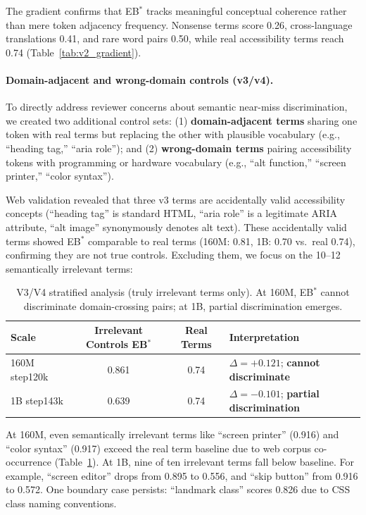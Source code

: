 \documentclass[10pt]{article} %
\begin{document}
The gradient confirms that EB$^*$ tracks meaningful conceptual coherence rather than mere token adjacency frequency. Nonsense terms score 0.26, cross-language translations 0.41, and rare word pairs 0.50, while real accessibility terms reach 0.74 (Table~\ref{tab:v2_gradient}).

\paragraph{Domain-adjacent and wrong-domain controls (v3/v4).}
To directly address reviewer concerns about semantic near-miss discrimination, we created two additional control sets:
(1) \textbf{domain-adjacent terms} sharing one token with real terms but replacing the other with plausible vocabulary (e.g., ``heading tag,'' ``aria role''); and
(2) \textbf{wrong-domain terms} pairing accessibility tokens with programming or hardware vocabulary (e.g., ``alt function,'' ``screen printer,'' ``color syntax'').

Web validation revealed that three v3 terms are accidentally valid accessibility concepts (``heading tag'' is standard HTML, ``aria role'' is a legitimate ARIA attribute, ``alt image'' synonymously denotes alt text).
These accidentally valid terms showed EB$^*$ comparable to real terms (160M: 0.81, 1B: 0.70 vs.\ real 0.74), confirming they are not true controls.
Excluding them, we focus on the 10--12 semantically irrelevant terms:

\begin{table}[h]
\centering
\small
\begin{tabular}{|l|c|c|l|}
\hline
\textbf{Scale} & \textbf{Irrelevant Controls EB$^*$} & \textbf{Real Terms} & \textbf{Interpretation} \\
\hline
160M step120k & 0.861 & 0.74 & $\Delta=+0.121$; \textbf{cannot discriminate} \\
1B step143k & 0.639 & 0.74 & $\Delta=-0.101$; \textbf{partial discrimination} \\
\hline
\end{tabular}
\caption{V3/V4 stratified analysis (truly irrelevant terms only). At 160M, EB$^*$ cannot discriminate domain-crossing pairs; at 1B, partial discrimination emerges.}
\label{tab:v3v4_stratified}
\end{table}

At 160M, even semantically irrelevant terms like ``screen printer'' (0.916) and ``color syntax'' (0.917) exceed the real term baseline due to web corpus co-occurrence (Table~\ref{tab:v3v4_stratified}). At 1B, nine of ten irrelevant terms fall below baseline. For example, ``screen editor'' drops from 0.895 to 0.556, and ``skip button'' from 0.916 to 0.572. One boundary case persists: ``landmark class'' scores 0.826 due to CSS class naming conventions.
\end{document}
